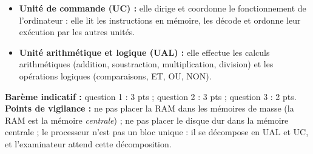 \documentclass[11pt]{article}
\begin{document}
\begin{corrige}
\begin{enumerate}
\begin{itemize}
\item \textbf{Unité de commande (UC) :} elle dirige et coordonne le fonctionnement de l'ordinateur : elle lit les instructions en mémoire, les décode et ordonne leur exécution par les autres unités.
\item \textbf{Unité arithmétique et logique (UAL) :} elle effectue les calculs arithmétiques (addition, soustraction, multiplication, division) et les opérations logiques (comparaisons, ET, OU, NON).
\end{itemize}
\end{enumerate}
\textbf{Barème indicatif :} question 1 : 3 pts ; question 2 : 3 pts ; question 3 : 2 pts.\\
\textbf{Points de vigilance :} ne pas placer la RAM dans les mémoires de masse (la RAM est la mémoire \emph{centrale}) ; ne pas placer le disque dur dans la mémoire centrale ; le processeur n'est pas un bloc unique : il se décompose en UAL et UC, et l'examinateur attend cette décomposition.
\end{corrige}
\end{document}
